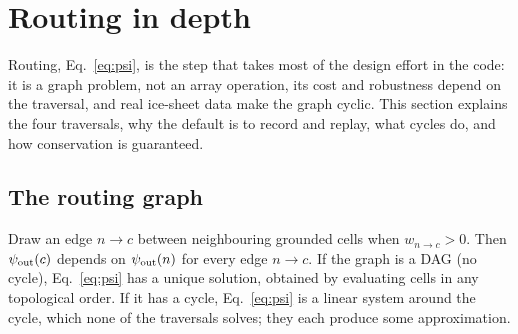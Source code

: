 \section{Routing in depth}\label{sec:routing}

Routing, Eq.~\eqref{eq:psi}, is the step that takes most of the design effort in the code: it is a graph problem, not
an array operation, its cost and robustness depend on the traversal, and real ice-sheet data make the graph cyclic. This
section explains the four traversals, why the default is to record and replay, what cycles do, and how conservation
is guaranteed.

\subsection{The routing graph}\label{rt:graph}
Draw an edge $n\to c$ between neighbouring grounded cells when $w_{n\to c} > 0$. Then ${\psi_{\rm out}}(c)$ depends on
${\psi_{\rm out}}(n)$ for every edge $n\to c$. If the graph is a DAG (no cycle), Eq.~\eqref{eq:psi} has a unique solution, obtained
by evaluating cells in any topological order. If it has a cycle, Eq.~\eqref{eq:psi} is a linear system around the cycle,
which none of the traversals solves; they each produce some approximation.

